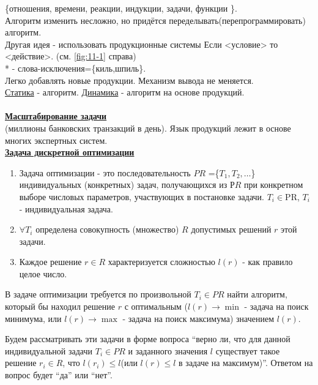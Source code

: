 \documentclass{article}
\numberwithin{example}{section}
\numberwithin{question}{section}
\numberwithin{Remark}{section}
\numberwithin{theorem}{section}
\numberwithin{definition}{section}
\numberwithin{proposition}{section}
\begin{document}
\{отношения, времени, реакции, индукции, задачи, функции \}.\\
Алгоритм изменить несложно, но придётся переделывать(перепрограммировать) алгоритм. \\
Другая идея - использовать продукционные системы Если <условие> то <действие>. (см. \ref{fig:11-1} справа)\\
* - слова-исключения=\{киль,шпиль\}.\\
Легко добавлять новые продукции. Механизм вывода не меняется.\\
\underline{Статика} - алгоритм. \underline{Динамика} - алгоритм на основе продукций.\\
\\
\underline{\textbf{Масштабирование задачи}}\\
(миллионы банковских транзакций в день). Язык продукций лежит в основе многих экспертных систем.\\
\underline{\textbf{Задача дискретной оптимизации}}
\begin{enumerate}
	\item Задача оптимизации - это последовательность $PR$ =\{$T_1,T_2,\ldots$\} индивидуальных (конкретных) задач, получающихся из $РR$ при конкретном выборе числовых параметров, участвующих в постановке задачи. $T_i\in$PR, $T_i$ - индивидуальная задача.
	\item $\forall T_i$ определена совокупность (множество) $R$ допустимых решений $r$ этой задачи.
	\item Каждое решение $r\in R$ характеризуется сложностью $l(r)$ - как правило целое число.
\end{enumerate}
В задаче оптимизации требуется по произвольной $T_i\in PR$ найти алгоритм, который бы находил решение $r$ с оптимальным ($l(r)\to \min$ - задача на поиск минимума, или $l(r)\to \max$ - задача на поиск максимума) значением $l(r)$.

Будем рассматривать эти задачи в форме вопроса ``верно ли, что для данной индивидуальной задачи $T_i\in PR$ и заданного значения $l$ существует такое решение $r_i\in R$, что $l(r_i)\leqslant l$(или $l(r)\leqslant l$ в задаче на максимум)''. Ответом на вопрос будет ``да'' или ``нет''.
\end{document}
